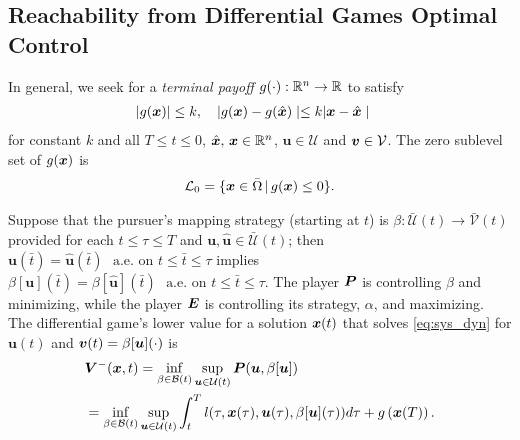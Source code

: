 \subsection{Reachability from Differential Games Optimal Control}

\noindent   In general, we seek for a \textit{terminal payoff} $g(\cdot): \mathbb{R}^n \rightarrow \mathbb{R}$ to satisfy
%
\begin{subequations}
	\begin{align}
		| g(\bm{x}) | &\le k, \quad | g(\bm{x}) - g(\hat{\bm{x}}) \mid \le k | \bm{x} - \hat{\bm{x}} \mid
	\end{align}
\end{subequations}
%
for constant $k$ and all $T \le t \le 0$, $\hat{\bm{x}}, \, \bm{x} \in \mathbb{R}^n$, $\bm{u}\in \mathcal{U}$ and $\bm{v} \in \mathcal{V}$.  The zero sublevel set of $g(\bm{x})$ is
%
\begin{align}
	\mathcal{L}_0 = \{ \bm{x} \in \bar{\Omega} \,|\, g(\bm{x}) \le 0 \}.
	\label{eq:target_set_syk}
\end{align}

Suppose that the pursuer's mapping strategy (starting at $t$) is $\beta: \mathcal{\bar{U}}({t}) \rightarrow \mathcal{\bar{V}}({t})$ provided for each $t \le \tau \le T$ and $\bm{u}, \hat{\bm{u}} \in \mathcal{\bar{U}}({t})$; then $\bm{u}(\bar{t}) = \hat{\bm{u}}(\bar{t}) \,\, \text{ a.e. on } t \le \bar{t}  \le \tau$ implies $\beta[\bm{u}](\bar{t}) = \beta[\hat{\bm{u}}](\bar{t}) \,\, \text{ a.e. on } t \le \bar{t}  \le \tau$. The player $\bm{P}$ is controlling $\beta$ and minimizing, while the player $\bm{E}$ is controlling its strategy, $\alpha$, and maximizing. %
%
The differential game's lower value for a solution $\bm{x}(t)$ that solves \eqref{eq:sys_dyn} for $\bm{u}(t)$ and $\bm{v}(t) = \beta[\bm{u}](\cdot)$ is 
%
\begin{align}
	&\lowervalue(\state, t) = \inf_{\beta \in \mathcal{B}(t)} \sup_{\bm{u} \in \mathcal{U}(t)} \bm{P}(\bm{u}, \beta[\bm{u}]) \nonumber \\
	&=  \inf_{\beta \in \mathcal{B}(t)} \sup_{\bm{u} \in \mathcal{U}(t)} %
	\int_{t}^{T} l(\tau, \bm{x}(\tau), \bm{u}(\tau), \beta[\bm{u}](\tau)) d\tau + g\left(\bm{x}(T)\right). %
	\label{eq:value_lower}
\end{align}

